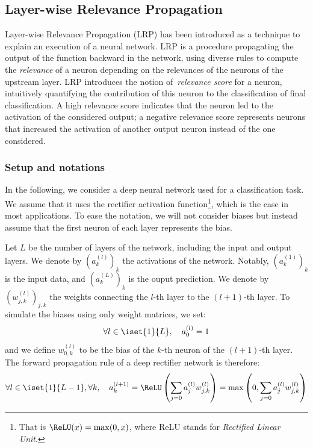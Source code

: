 \documentclass{../cs-classes/cs-classes}
\begin{document}
\subsection{Layer-wise Relevance Propagation}
Layer-wise Relevance Propagation (LRP) \cite{bach-2015} has been introduced as a technique to explain an execution of a neural network. LRP is a procedure propagating the output of the function backward in the network, using diverse rules to compute the \emph{relevance} of a neuron depending on the relevances of the neurons of the upstream layer. LRP introduces the notion of \emph{relevance score} for a neuron, intuitively quantifying the contribution of this neuron to the classification of final classification. A high relevance score indicates that the neuron led to the activation of the considered output; a negative relevance score represents neurons that increased the activation of another output neuron instead of the one considered.

\subsubsection{Setup and notations}
In the following, we consider a deep neural network used for a classification task. We assume that it uses the rectifier activation function\footnote{That is $\ReLU(x)=\max(0, x)$, where ReLU stands for \emph{Rectified Linear Unit}.}, which is the case in most applications. To ease the notation, we will not consider biases but instead assume that the first neuron of each layer represents the bias. 

Let $L$ be the number of layers of the network, including the input and output layers. We denote by $\left(a^{(l)}_k\right)_k$ the activations of the network. Notably, $\left(a^{(1)}_k\right)_k$ is the input data, and $\left(a^{(L)}_k\right)_k$ is the ouput prediction. We denote by $\left(w^{(l)}_{j, k}\right)_{j, k}$ the weights connecting the $l$-th layer to the $(l+1)$-th layer. To simulate the biases using only weight matrices, we set:
\begin{equation*}
    \forall l\in\iset{1}{L}, \quad a^{(l)}_0 = 1
\end{equation*}
and we define $w^{(l)}_{0, k}$ to be the bias of the $k$-th neuron of the $(l+1)$-th layer. The forward propagation rule of a deep rectifier network is therefore:
\begin{equation}
    \forall l\in\iset{1}{L-1}, \forall k, \quad a^{(l+1)}_k = \ReLU\left(\sum_{j=0}a^{(l)}_j w^{(l)}_{j, k}\right) = \max\left(0, \sum_{j=0}a^{(l)}_j w^{(l)}_{j, k}\right)
\end{equation}
\end{document}
